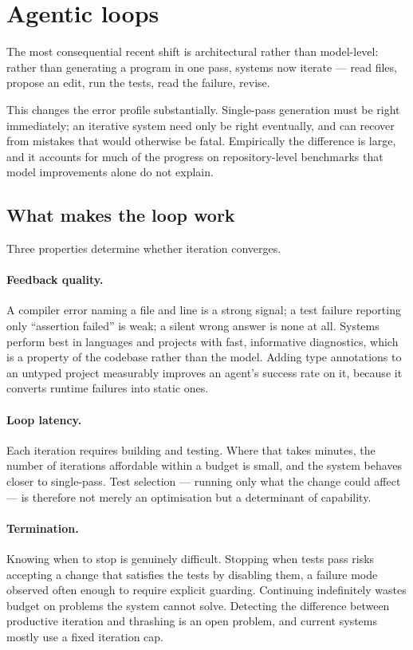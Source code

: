 \documentclass[11pt,a4paper]{article}
\begin{document}
\section{Agentic loops}
\label{sec:agentic}

The most consequential recent shift is architectural rather than
model-level: rather than generating a program in one pass, systems now iterate
--- read files, propose an edit, run the tests, read the failure, revise.

This changes the error profile substantially. Single-pass generation must be
right immediately; an iterative system need only be right eventually, and can
recover from mistakes that would otherwise be fatal. Empirically the
difference is large, and it accounts for much of the progress on
repository-level benchmarks \cite{jimenez2024} that model improvements alone
do not explain.

\subsection{What makes the loop work}

Three properties determine whether iteration converges.

\paragraph{Feedback quality.}
A compiler error naming a file and line is a strong signal; a test failure
reporting only ``assertion failed'' is weak; a silent wrong answer is none at
all. Systems perform best in languages and projects with fast, informative
diagnostics, which is a property of the codebase rather than the model. Adding
type annotations to an untyped project measurably improves an agent's success
rate on it, because it converts runtime failures into static ones.

\paragraph{Loop latency.}
Each iteration requires building and testing. Where that takes minutes, the
number of iterations affordable within a budget is small, and the system
behaves closer to single-pass. Test selection --- running only what the change
could affect --- is therefore not merely an optimisation but a determinant of
capability.

\paragraph{Termination.}
Knowing when to stop is genuinely difficult. Stopping when tests pass risks
accepting a change that satisfies the tests by disabling them, a failure mode
observed often enough to require explicit guarding. Continuing indefinitely
wastes budget on problems the system cannot solve. Detecting the difference
between productive iteration and thrashing is an open problem, and current
systems mostly use a fixed iteration cap.
\end{document}
